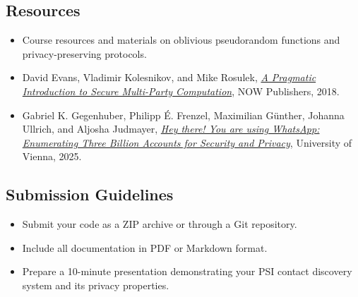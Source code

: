 \documentclass[10pt,a4paper,american]{exam}
\begin{document}
\subsection*{Resources}
\begin{itemize}
	\item Course resources and materials on oblivious pseudorandom functions and privacy-preserving protocols.
	\item David Evans, Vladimir Kolesnikov, and Mike Rosulek, \href{https://appliedcryptography.page/paper/\#pragmatic-mpc}{\emph{A Pragmatic Introduction to Secure Multi-Party Computation}}, NOW Publishers, 2018.
	\item Gabriel K. Gegenhuber, Philipp \'E. Frenzel, Maximilian G\"unther, Johanna Ullrich, and Aljosha Judmayer, \href{https://appliedcryptography.page/paper/\#whatsapp-enumeration}{\emph{Hey there! You are using WhatsApp: Enumerating Three Billion Accounts for Security and Privacy}}, University of Vienna, 2025.
\end{itemize}

\subsection*{Submission Guidelines}
\begin{itemize}
	\item Submit your code as a ZIP archive or through a Git repository.
	\item Include all documentation in PDF or Markdown format.
	\item Prepare a 10-minute presentation demonstrating your PSI contact discovery system and its privacy properties.
\end{itemize}
\end{document}
